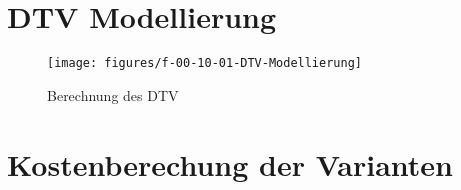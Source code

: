 
















%

%

%

\newpage
\printbibliography[heading=bibintoc, title=Literaturverzeichnis]


\cleardoublepage
{}



\appendix
{}
\label{chap:Anhang}

\section{DTV Modellierung}
\label{subsec:DTVModellierung}

\begin{figure}[h!]
	\centering
	\texttt{[image: figures/f-00-10-01-DTV-Modellierung]}
	\caption{Berechnung des DTV}
	\label{img:DTVModellierung}
\end{figure}


\section{Kostenberechung der Varianten}
\label{sec:Ahangkostenberechnug}



\printindex



